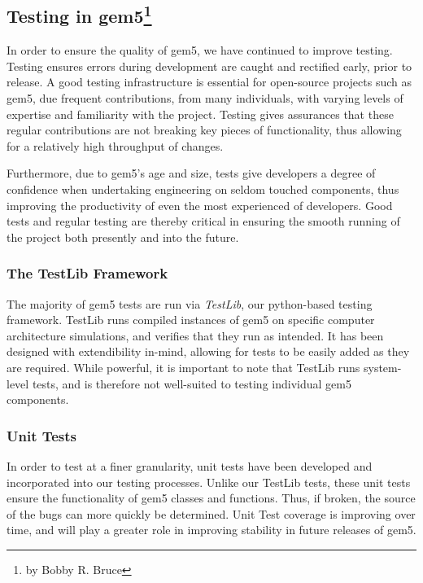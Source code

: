 \subsection[Testing in gem5]{Testing in gem5\footnote{by Bobby R. Bruce}}
\label{sec:testing}

In order to ensure the quality of gem5, we have continued to improve testing.
Testing ensures errors during development are caught and rectified early, prior
to release. A good testing infrastructure is essential for open-source projects
such as gem5, due frequent contributions, from many individuals, with varying
levels of expertise and familiarity with the project. Testing gives assurances
that these regular contributions are not breaking key pieces of functionality,
thus allowing for a relatively high throughput of changes.

Furthermore, due to gem5's age and size, tests give developers a degree of
confidence when undertaking engineering on seldom touched components, thus
improving the productivity of even the most experienced of developers. Good
tests and regular testing are thereby critical in ensuring the smooth running
of the project both presently and into the future.

\subsubsection{The TestLib Framework}

The majority of gem5 tests are run via \emph{TestLib}, our python-based
testing framework. TestLib runs compiled instances of gem5 on specific
computer architecture simulations, and verifies that they run as intended. It
has been designed with extendibility in-mind, allowing for tests to be easily
added as they are required. While powerful, it is important to note that
TestLib runs system-level tests, and is therefore not well-suited to testing
individual gem5 components.

\subsubsection{Unit Tests}

In order to test at a finer granularity, unit tests have been developed and
incorporated into our testing processes. Unlike our TestLib tests, these unit
tests ensure the functionality of gem5 classes and functions. Thus, if broken,
the source of the bugs can more quickly be determined. Unit Test coverage is
improving over time, and will play a greater role in improving stability in
future releases of gem5.

